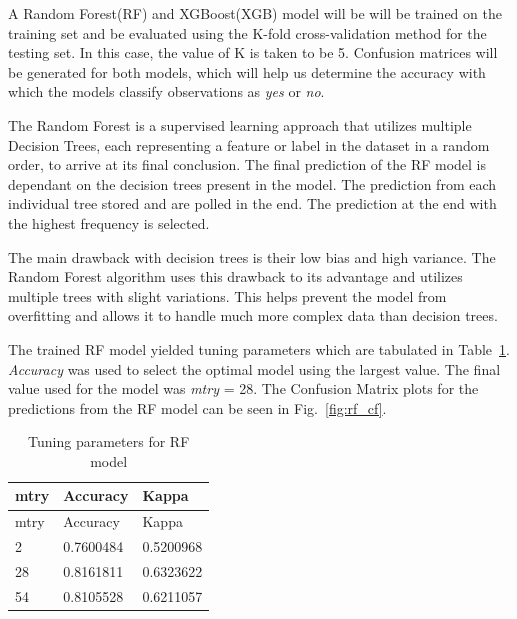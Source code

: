 \documentclass[runningheads]{llncs}
\makeatletter
\let\oldsubsubsection\subsubsection
\renewcommand\subsubsection{\@ifstar{\oldsubsubsection}{\oldsubsubsection*}}
\makeatother
\begin{document}
A Random Forest(RF) and XGBoost(XGB) model will be will be trained on
the training set and be evaluated using the K-fold cross-validation
method for the testing set. In this case, the value of K is taken to be
5. Confusion matrices will be generated for both models, which will help
us determine the accuracy with which the models classify observations as
\emph{yes} or \emph{no}.

\hypertarget{random-forest}{%
\subsubsection{Random Forest}\label{random-forest}}

The Random Forest is a supervised learning approach that utilizes
multiple Decision Trees, each representing a feature or label in the
dataset in a random order, to arrive at its final conclusion. The final
prediction of the RF model is dependant on the decision trees present in
the model. The prediction from each individual tree stored and are
polled in the end. The prediction at the end with the highest frequency
is selected.

The main drawback with decision trees is their low bias and high
variance. The Random Forest algorithm uses this drawback to its
advantage and utilizes multiple trees with slight variations. This helps
prevent the model from overfitting and allows it to handle much more
complex data than decision trees.

The trained RF model yielded tuning parameters which are tabulated in
Table~\ref{tbl:rf_params}. \emph{Accuracy} was used to select the optimal
model using the largest value. The final value used for the model was
\emph{mtry} = 28. The Confusion Matrix plots for the predictions from
the RF model can be seen in Fig.~\ref{fig:rf_cf}.

\hypertarget{tbl:rf_params}{}
\begin{longtable}[]{@{}lll@{}}
\caption{\label{tbl:rf_params}Tuning parameters for RF
model}\tabularnewline
\toprule
mtry & Accuracy & Kappa\tabularnewline
\midrule
\endfirsthead
\toprule
mtry & Accuracy & Kappa\tabularnewline
\midrule
\endhead
2 & 0.7600484 & 0.5200968\tabularnewline
28 & 0.8161811 & 0.6323622\tabularnewline
54 & 0.8105528 & 0.6211057\tabularnewline
\bottomrule
\end{longtable}
\end{document}
